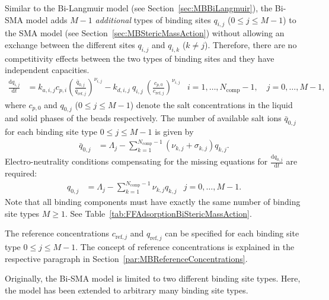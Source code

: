 Similar to the Bi-Langmuir model (see Section~\ref{sec:MBBiLangmuir}), the Bi-SMA model adds $M - 1$ \emph{additional} types of binding sites $q_{i,j}$ ($0 \leq j \leq M - 1$) to the SMA model (see Section~\ref{sec:MBStericMassAction}) without allowing an exchange between the different sites $q_{i,j}$ and $q_{i,k}$ ($k \neq j$). 
Therefore, there are no competitivity effects between the two types of binding sites and they have independent capacities.
\begin{align*}
  \frac{\mathrm{d} q_{i,j}}{\mathrm{d} t} &= k_{a,i,j} c_{p,i} \left(\frac{\bar{q}_{0,j}}{q_{\text{ref},j}} \right)^{\nu_{i,j}} - k_{d,i,j}\: q_{i,j}\: \left(\frac{c_{p,0}}{c_{\text{ref},j}}\right)^{\nu_{i,j}} & i = 1, \dots, N_{\text{comp}} - 1, \quad j = 0, \dots, M - 1,
\end{align*}
where $c_{p,0}$ and $q_{0,j}$ ($0 \leq j \leq M - 1$) denote the salt concentrations in the liquid and solid phases of the beads respectively. The number of available salt ions $\bar{q}_{0,j}$ for each binding site type $0 \leq j \leq M - 1$ is given by
\begin{align*}
  \bar{q}_{0,j} &= \Lambda_j - \sum_{k=1}^{N_{\text{comp}} - 1} \left( \nu_{k,j} + \sigma_{k,j} \right) q_{k,j}.
\end{align*}
Electro-neutrality conditions compensating for the missing equations for $\frac{\mathrm{d} q_{0,j}}{\mathrm{d}t}$ are required:
\begin{align*}
  q_{0,j} &= \Lambda_j - \sum_{k=1}^{N_{\text{comp}} - 1} \nu_{k,j} q_{k,j} & j = 0, \dots, M - 1.
\end{align*}
Note that all binding components must have exactly the same number of binding site types $M \geq 1$.
See Table~\ref{tab:FFAdsorptionBiStericMassAction}.

The reference concentrations $c_{\text{ref},j}$ and $q_{\text{ref},j}$ can be specified for each binding site type $0 \leq j \leq M - 1$.
The concept of reference concentrations is explained in the respective paragraph in Section~\ref{par:MBReferenceConcentrations}.

Originally, the Bi-SMA model is limited to two different binding site types.
Here, the model has been extended to arbitrary many binding site types.
